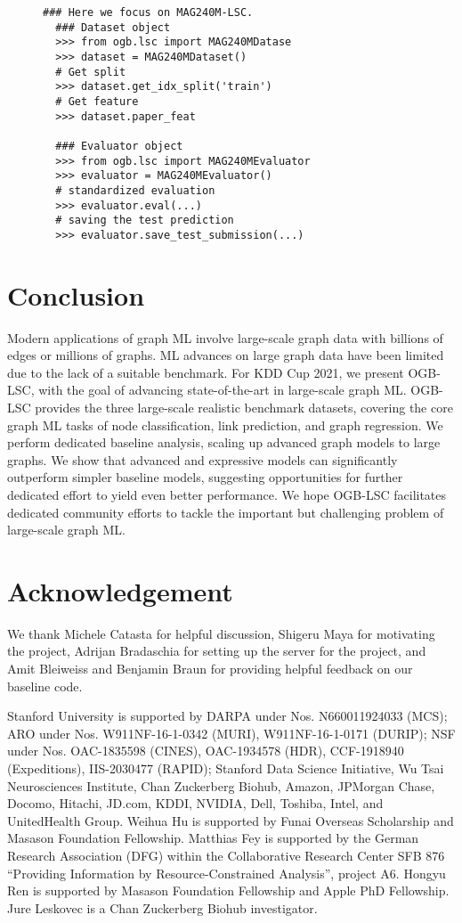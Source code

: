 \documentclass{article}
\newcommand{\challengeshort}{OGB-LSC}
\begin{document}
\begin{figure}[t]
\begin{lstlisting}[title={Code Snippet 1: \textbf{OGB Python package}},captionpos=b]
  ### Here we focus on MAG240M-LSC.
  ### Dataset object
  >>> from ogb.lsc import MAG240MDatase
  >>> dataset = MAG240MDataset()
  # Get split
  >>> dataset.get_idx_split('train')
  # Get feature
  >>> dataset.paper_feat

  ### Evaluator object
  >>> from ogb.lsc import MAG240MEvaluator
  >>> evaluator = MAG240MEvaluator()
  # standardized evaluation
  >>> evaluator.eval(...)
  # saving the test prediction
  >>> evaluator.save_test_submission(...)
\end{lstlisting}
\end{figure} 
\section{Conclusion}
\label{sec:conclusion}
Modern applications of graph ML involve large-scale graph data with billions of edges or millions of graphs.
ML advances on large graph data have been limited due to the lack of a suitable benchmark.
For KDD Cup 2021, we present \challengeshort{}, with the goal of advancing state-of-the-art in large-scale graph ML. 
\challengeshort{} provides the three large-scale realistic benchmark datasets, covering the core graph ML tasks of node classification, link prediction, and graph regression.
We perform dedicated baseline analysis, scaling up advanced graph models to large graphs.
We show that advanced and expressive models can significantly outperform simpler baseline models, suggesting opportunities for further dedicated effort to yield even better performance.
We hope \challengeshort{} facilitates dedicated community efforts to tackle the important but challenging problem of large-scale graph ML. 
\section*{Acknowledgement}
We thank Michele Catasta for helpful discussion, Shigeru Maya for motivating the project, Adrijan Bradaschia for setting up the server for the project, and Amit Bleiweiss and Benjamin Braun for providing helpful feedback on our baseline code. 

Stanford University is supported by DARPA under Nos. N660011924033 (MCS);
ARO under Nos. W911NF-16-1-0342 (MURI), W911NF-16-1-0171 (DURIP);
NSF under Nos. OAC-1835598 (CINES), OAC-1934578 (HDR), CCF-1918940 (Expeditions), IIS-2030477 (RAPID);
Stanford Data Science Initiative, 
Wu Tsai Neurosciences Institute,
Chan Zuckerberg Biohub,
Amazon, JPMorgan Chase, Docomo, Hitachi, JD.com, KDDI, NVIDIA, Dell, Toshiba, Intel, and UnitedHealth Group. 
Weihua Hu is supported by Funai Overseas Scholarship and Masason Foundation Fellowship.
Matthias Fey is supported by the German Research Association (DFG) within the Collaborative Research Center SFB 876 ``Providing Information by Resource-Constrained Analysis'', project A6.
Hongyu Ren is supported by Masason Foundation Fellowship and Apple PhD Fellowship.
Jure Leskovec is a Chan Zuckerberg Biohub investigator.
\end{document}
